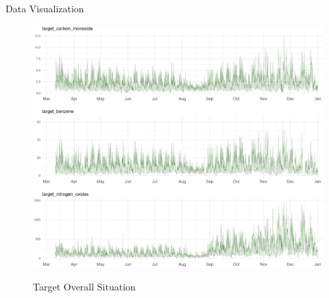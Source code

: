 \documentclass[
 size=14pt,
 paper=smartboard,  %
 mode=present, 		%
 display=slides, 	%
 style=tuliplab,  	%
 pauseslide,
 fleqn,leqno]{powerdot}
\begin{document}
\begin{slide}[toc=,bm=]{Data Visualization}

\begin{figure}
  \centering
  \includegraphics[scale=0.3]{figures//p1.eps}\\
  \caption{Target Overall Situation}\label{fig:Target Overall Situation}
\end{figure}

\end{slide}
\end{document}
